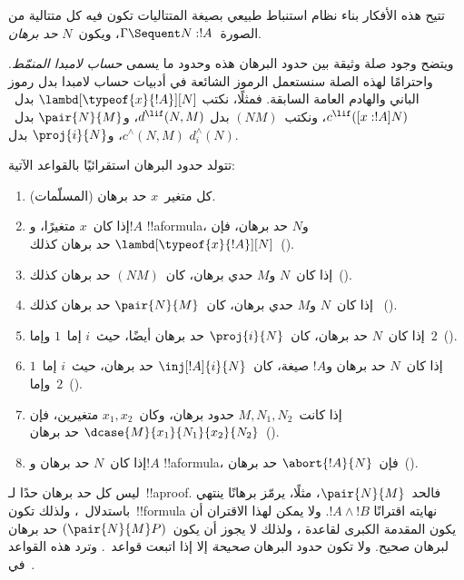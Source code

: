 \documentclass[../../../include/open-logic-section]{subfiles}
\begin{document}
تتيح هذه الأفكار بناء نظام استنباط طبيعي بصيغة المتتاليات تكون فيه كل
متتالية من الصورة~$\Gamma\Sequent N:!A$، ويكون~$N$ \emph{حد برهان}.

ويتضح وجود صلة وثيقة بين حدود البرهان هذه وحدود ما يسمى \emph{حساب لامبدا
المنمّط}. واحترامًا لهذه الصلة سنستعمل الرموز الشائعة في أدبيات حساب لامبدا
بدل رموز الباني والهادم العامة السابقة. فمثلًا، نكتب
$\lambd[\typeof{x}{!A}][N]$ بدل~$c^{\lif}([x:!A]N)$، ونكتب~$(NM)$ بدل
$d^{\lif}(N,M)$، و$\pair{N}{M}$ بدل~$c^\land(N,M)$، و$\proj{i}{N}$ بدل
$d^\land_i(N)$.

\begin{defn}
  تتولد حدود البرهان استقرائيًا بالقواعد الآتية:
  \begin{enumerate}
  \item كل متغير~$x$ حد برهان (المسلّمات).
  \item إذا كان~$x$ متغيرًا، و$!A$ !!a{formula}، و$N$ حد برهان، فإن
    $\lambd[\typeof{x}{!A}][N]$ حد برهان كذلك~(\Intro\lif).
  \item إذا كان~$N$ و$M$ حدي برهان، كان~$(NM)$ حد برهان كذلك~(\Elim\lif).
  \item إذا كان~$N$ و$M$ حدي برهان، كان~$\pair{N}{M}$ حد برهان كذلك
    ~(\Intro\land).
  \item إذا كان~$N$ حد برهان، كان~$\proj{i}{N}$ حد برهان أيضًا، حيث~$i$
    إما~$1$ وإما~$2$~(\Elim\land[i]).
  \item إذا كان~$N$ حد برهان و$!A$ صيغة، كان~$\inj[!A]{i}{N}$ حد برهان،
    حيث~$i$ إما~$1$ وإما~$2$~(\Intro\lor[i]).
  \item إذا كانت~$M,N_1,N_2$ حدود برهان، وكان~$x_1,x_2$ متغيرين، فإن
    $\dcase{M}{x_1}{N_1}{x_2}{N_2}$ حد برهان~(\Elim\lor).
  \item إذا كان~$N$ حد برهان و$!A$ !!a{formula}، فإن~$\abort{!A}{N}$
    حد برهان~(\FalseInt).
  \end{enumerate}
\end{defn}

ليس كل حد برهان حدًا لـ~!!a{proof}. فالحد~$\pair{N}{M}$، مثلًا، يرمّز
برهانًا ينتهي باستدلال~\Intro{\land}، ولذلك تكون~!!{formula} نهايته اقترانًا
$!A\land !B$. ولا يمكن لهذا الاقتران أن يكون المقدمة الكبرى لقاعدة
\Elim{\lif}، ولذلك لا يجوز أن يكون~$(\pair{N}{M}P)$ حد برهان لبرهان صحيح.
ولا تكون حدود البرهان \emph{صحيحة} إلا إذا اتبعت قواعد~. وترد
هذه القواعد في~.


\end{document}
